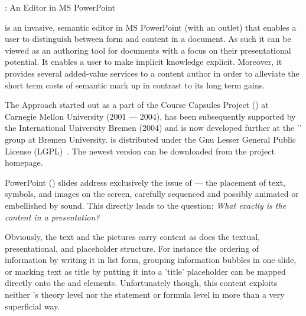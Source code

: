
\begin{omgroup}[id=cpoint,short=CPoint,creators=ako]
                           {\cpoint: An {\omdoc} Editor in MS PowerPoint}
\def\cpauthor{\scsys{CPointAuthor}}
\def\cpstudent{\scsys{CPointStudent}}
\def\cpbasic{\scsys{CPointBasic}} 
\def\cpgraphs{\scsys{CPointGraphs}}
\def\cpimport{\scsys{CPointImport}}
\def\cpnotes{\scsys{CPointNotes}}
\def\texpoint{\scsys{TexPoint}} 


{\cpoint} is an invasive, semantic {\omdoc} editor in MS PowerPoint (with an {\omdoc}
outlet) that enables a user to distinguish between form and content in a document. As such
it can be viewed as an authoring tool for {\omdoc} documents with a focus on their
presentational potential. It enables a user to make implicit knowledge explicit. Moreover,
it provides several added-value services to a content author in order to alleviate the
short term costs of semantic mark up in contrast to its long term gains.

\begin{omgroup}[id=cpoint.background]{The {\cpoint} Approach}
{\cpoint} started out as a part of the Course Capsules Project
({\ccaps}) at Carnegie Mellon University (2001 --- 2004), has been subsequently supported by the
International University Bremen (2004) and is now developed further at the '{}' group at Bremen University. {\cpoint} is distributed under
the Gnu Lesser General Public License (LGPL)~\cite{LGPL}.  The newest version can be
downloaded from the project homepage.

PowerPoint ({\ppt}) slides address exclusively the issue of {} ---
the placement of text, symbols, and images on the screen, carefully sequenced and possibly
animated or embellished by sound. This directly leads to the question: {\emph{What exactly
    is the content in a {\ppt} presentation?}}

Obviously, the text and the pictures carry content as does the textual, presentational,
and placeholder structure.  For instance the ordering of information by writing it in list
form, grouping information bubbles in one slide, or marking text as title by putting it
into a 'title' placeholder can be mapped directly onto the {\omdoc} {}
and {} elements.  Unfortunately though, this content exploits neither
{\omdoc}'s theory level nor the statement or formula level in more than a very superficial
way.


\end{omgroup}
\end{omgroup}
